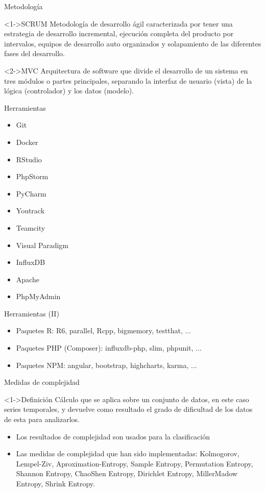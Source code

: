 \begin{tframe}{Metodología}
	\begin{block}<1->{SCRUM}
		Metodología de desarrollo ágil caracterizada por tener una estrategia de desarrollo incremental, ejecución completa del producto por 			intervalos, equipos de desarrollo auto organizados y solapamiento de las diferentes fases del desarrollo.
	\end{block}
	\begin{block}<2->{MVC}
		Arquitectura de software que divide el desarrollo de un sistema en tres módulos o partes principales, separando la interfaz de usuario (vista) de la lógica (controlador) y los datos (modelo).
	\end{block}
\end{tframe}

\begin{tframe}{Herramientas}
	\begin{itemize}
		\item Git
		\item Docker
		\item RStudio
		\item PhpStorm
		\item PyCharm
		\item Youtrack
		\item Teamcity
		\item Visual Paradigm
		\item InfluxDB
		\item Apache
		\item PhpMyAdmin
	\end{itemize}	
\end{tframe}

\begin{tframe}{Herramientas (II)}
	\begin{itemize}
		\item Paquetes R: R6, parallel, Rcpp, bigmemory, testthat, ...
		\item Paquetes PHP (Composer): influxdb-php, slim, phpunit, ...
		\item Paquetes NPM: angular, bootstrap, highcharts, karma, ...
	\end{itemize}	
\end{tframe}

\begin{tframe}{Medidas de complejidad}
	\begin{block}<1->{Definición}
		Cálculo que se aplica sobre un conjunto de datos, en este caso series temporales, y devuelve como resultado el grado de dificultad de los datos de esta para analizarlos.
	\end{block}
	\begin{itemize}
		\item Los resultados de complejidad son usados para la clasificación
		\item Las medidas de complejidad que han sido implementadas: Kolmogorov, Lempel-Ziv, Aproximation-Entropy, Sample Entropy, Permutation Entropy, Shannon Entropy, ChaoShen Entropy, Dirichlet Entropy, MillerMadow Entropy, Shrink Entropy.
	\end{itemize}
\end{tframe}

